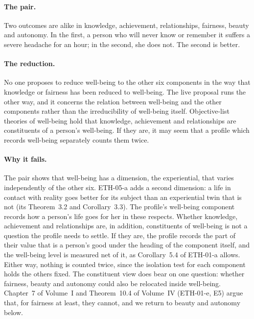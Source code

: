 \documentclass{situationist-preprint}
\begin{document}
\paragraph{The pair.} Two outcomes are alike in knowledge, achievement, relationships, fairness, beauty and autonomy. In the first, a person who will never know or remember it suffers a severe headache for an hour; in the second, she does not. The second is better.

\paragraph{The reduction.} No one proposes to reduce well-being to the other six components in the way that knowledge or fairness has been reduced to well-being. The live proposal runs the other way, and it concerns the relation between well-being and the other components rather than the irreducibility of well-being itself. Objective-list theories of well-being \citep{Parfit1984,Griffin1986,Fletcher2013} hold that knowledge, achievement and relationships are constituents of a person's well-being. If they are, it may seem that a profile which records well-being separately counts them twice.

\paragraph{Why it fails.} The pair shows that well-being has a dimension, the experiential, that varies independently of the other six. ETH-05-a adds a second dimension: a life in contact with reality goes better for its subject than an experiential twin that is not (its Theorem~3.2 and Corollary~3.3). The profile's well-being component records how a person's life goes for her in these respects. Whether knowledge, achievement and relationships are, in addition, constituents of well-being is not a question the profile needs to settle. If they are, the profile records the part of their value that is a person's good under the heading of the component itself, and the well-being level is measured net of it, as Corollary~5.4 of ETH-01-a allows. Either way, nothing is counted twice, since the isolation test for each component holds the others fixed. The constituent view does bear on one question: whether fairness, beauty and autonomy could also be relocated inside well-being. Chapter~7 of Volume~I and Theorem~10.4 of Volume~IV (ETH-01-e, E5) argue that, for fairness at least, they cannot, and we return to beauty and autonomy below.
\end{document}
